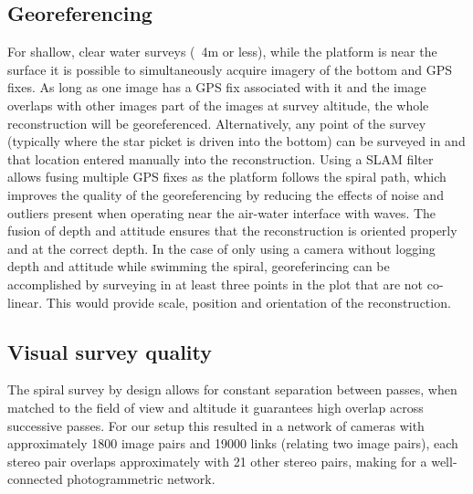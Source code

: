 \subsection{Georeferencing}
For shallow, clear water surveys (~4m or less), while the platform is near the surface it is possible to simultaneously acquire imagery of the bottom and GPS fixes. As long as one image has a GPS fix associated with it and the image overlaps with other images part of the images at survey altitude, the whole reconstruction will be georeferenced. Alternatively, any point of the survey (typically where the star picket is driven into the bottom) can be surveyed in and that location entered manually into the reconstruction. Using a SLAM filter allows fusing multiple GPS fixes as the platform follows the spiral path, which improves the quality of the georeferencing by reducing the effects of noise and outliers present when operating near the air-water interface with waves.
The fusion of depth and attitude ensures that the reconstruction is oriented properly and at the correct depth. In the case of only using a camera without logging depth and attitude while swimming the spiral, georeferincing can be accomplished by surveying in at least three points in the plot that are not co-linear. This would provide scale, position and orientation of the reconstruction.

\subsection{Visual survey quality}
The spiral survey by design allows for constant separation between passes, when matched to the field of view and altitude it guarantees high overlap across successive passes. For our setup this resulted in a network of cameras with approximately 1800 image pairs and 19000 links (relating two image pairs), each stereo pair overlaps approximately with 21 other stereo pairs, making for a well-connected photogrammetric network.


    
  
  